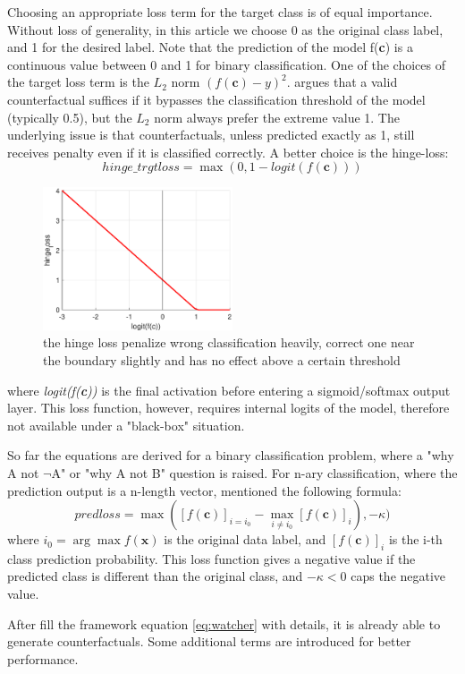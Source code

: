 Choosing an appropriate loss term for the target class is of equal importance. Without loss of generality, in this article we choose 0 as the original class label, and 1 for the desired label. Note that the prediction of the model f(\textbf{c}) is a continuous value between 0 and 1 for binary classification. One of the choices of the target loss term is the \emph{$L_2$} norm $(f(\textbf{c})-y)^2$. \cite{DiCE} argues that a valid counterfactual suffices if it bypasses the classification threshold of the model (typically 0.5), but the \emph{$L_2$} norm always prefer the extreme value 1. The underlying issue is that counterfactuals, unless predicted exactly as 1, still receives penalty even if it is classified correctly. A better choice is the hinge-loss:
\begin{equation}\label{eq:hingeloss}
  hinge\_trgtloss=\max(0,1-logit(f(\textbf{c})))
\end{equation}
\begin{figure}
  \centering
  \includegraphics[width=0.5\textwidth]{hingeloss.eps}
  \caption{the hinge loss penalize wrong classification heavily, correct one near the boundary slightly and has no effect above a certain threshold}\label{fig:hingeloss}
\end{figure}
where \emph{logit(f(\textbf{c}))} is the final activation before entering a sigmoid/softmax output layer. This loss function, however, requires internal logits of the model, therefore not available under a "black-box" situation.

So far the equations are derived for a binary classification problem, where a "why A not $\neg${A}" or "why A not B" question is raised. For n-ary classification, where the prediction output is a n-length vector, \cite{prototype} mentioned the following formula:
\begin{equation}\label{eq:lossPred}
  predloss=\max([f(\textbf{c})]_{i=i_0}-\max_{i\neq i_0}[f(\textbf{c})]_i),-\kappa)
\end{equation}
where $i_0=\arg\max f(\textbf{x})$ is the original data label, and $[f(\textbf{c})]_i$ is the i-th class prediction probability. This loss function gives a negative value if the predicted class is different than the original class, and $-\kappa < 0$ caps the negative value.

After fill the framework equation \ref{eq:watcher} with details, it is already able to generate counterfactuals. Some additional terms are introduced for better performance.

